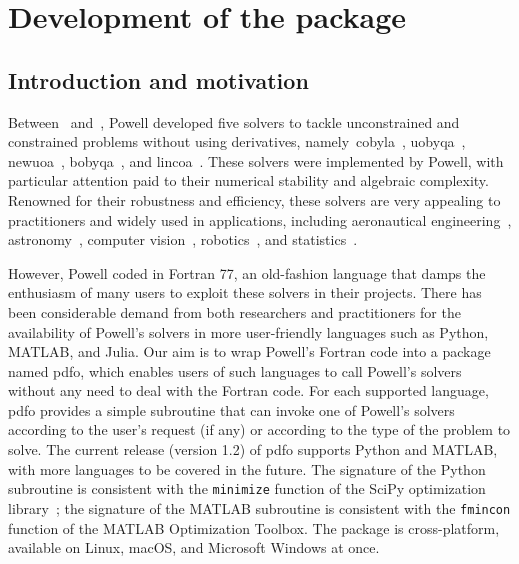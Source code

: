 %
%
%
\chapter{Development of the  package}
\label{ch:pdfo}

\section{Introduction and motivation}

Between~\citeyear{Powell_1994} and~\citeyear{Powell_2015}, Powell developed five solvers to tackle unconstrained and constrained problems without using derivatives, namely~\gls{cobyla}~\cite{Powell_1994}, \gls{uobyqa}~\cite{Powell_2002}, \gls{newuoa}~\cite{Powell_2006}, \gls{bobyqa}~\cite{Powell_2009}, and \gls{lincoa}~\cite{Powell_2015}.
These solvers were implemented by Powell, with particular attention paid to their numerical stability and algebraic complexity.
Renowned for their robustness and efficiency, these solvers are very appealing to practitioners and widely used in applications, including aeronautical engineering~\cite{Gallard_Etal_2018}, astronomy~\cite{Biviano_Etal_2013,Mamon_Biviano_Boue_2013}, computer vision~\cite{Izadinia_Shan_Seitz_2017}, robotics~\cite{Mombaur_Truong_Laumond_2010}, and statistics~\cite{Bates_Etal_2015}.

However, Powell coded in Fortran 77, an old-fashion language that damps the enthusiasm of many users to exploit these solvers in their projects.
There has been considerable demand from both researchers and practitioners for the availability of Powell's solvers in more user-friendly languages such as Python, MATLAB, and Julia.
Our aim is to wrap Powell's Fortran code into a package named \gls{pdfo}, which enables users of such languages to call Powell's solvers without any need to deal with the Fortran code.
For each supported language, \gls{pdfo} provides a simple subroutine that can invoke one of Powell's solvers according to the user's request (if any) or according to the type of the problem to solve.
The current release (version 1.2) of \gls{pdfo} supports Python and MATLAB, with more languages to be covered in the future.
The signature of the Python subroutine is consistent with the \texttt{minimize} function of the SciPy optimization library~\cite{Virtanen_Etal_2020};
the signature of the MATLAB subroutine is consistent with the \texttt{fmincon} function of the MATLAB Optimization Toolbox.
The package is cross-platform, available on Linux, macOS, and Microsoft Windows at once.

